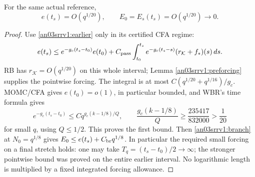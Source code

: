 \documentclass[11pt]{article}
\numberwithin{equation}{section}
\theoremstyle{remark}\newtheorem{remark}[theorem]{Remark}
\newcommand{\dd}{\,d}\newcommand{\E}{\mathbb E}
\newcommand{\KK}{\mathcal K}\newcommand{\BB}{\mathcal B}
\begin{document}
\begin{proposition}
\label{an03srrv1:E0}
For the same actual reference,
\begin{equation}
 e(t_s)=O(q^{1/20}),\qquad E_0=E_s(t_s)=O(q^{1/20})\to0.
 \label{an03srrv1:entryrate}
\end{equation}
\end{proposition}
\begin{proof}
Use \eqref{an03srrv1:earlier} only in its certified CFA regime:
\[
 e(t_s)\le e^{-g_c(t_s-t_0)}e(t_0)
 +C_{\rm pass}\int_{t_0}^{t_s}e^{-g_c(t_s-s)}
                      (r_\KK+f_*)(s)\dd s.
\]
RB has $r_\KK=O(q^{1/20})$ on this whole interval; Lemma
\ref{an03srrv1:preforcing} supplies the pointwise forcing.
The integral is at most $C(q^{1/20}+q^{1/16})/g_c$.
MOMC/CFA gives $e(t_0)=o(1)$, in particular bounded, and WBR's
time formula gives
\[
 e^{-g_c(t_s-t_0)}\le Cq^{g_c(k-1/8)/Q},\qquad
 \frac{g_c(k-1/8)}Q\ge\frac{235417}{832000}>\frac1{20}
\]
for small $q$, using $Q\le1/2$.
This proves the first bound. Then \eqref{an03srrv1:branch} at
$N_0=q^{1/8}$ gives
$E_0\le e(t_s)+C_{\rm br}q^{1/8}$.
In particular the required small forcing on a final stretch holds:
one may take $T_q=(t_s-t_0)/2\to\infty$; the stronger pointwise
bound was proved on the entire earlier interval. No logarithmic
length is multiplied by a fixed integrated forcing allowance.
\end{proof}
\end{document}
